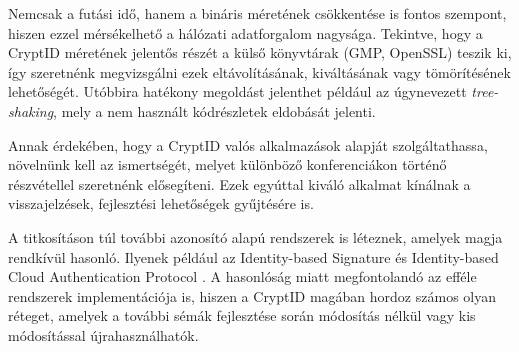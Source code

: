Nemcsak a futási idő, hanem a bináris méretének csökkentése is fontos szempont, hiszen ezzel mérsékelhető a hálózati adatforgalom nagysága. Tekintve, hogy a CryptID méretének jelentős részét a külső könyvtárak (GMP, OpenSSL) teszik ki, így szeretnénk megvizsgálni ezek eltávolításának, kiváltásának vagy tömörítésének lehetőségét. Utóbbira hatékony megoldást jelenthet például az úgynevezett \textit{tree-shaking}, mely a nem használt kódrészletek eldobását jelenti.

Annak érdekében, hogy a CryptID valós alkalmazások alapját szolgáltathassa, növelnünk kell az ismertségét, melyet különböző konferenciákon történő részvétellel szeretnénk elősegíteni. Ezek egyúttal kiváló alkalmat kínálnak a visszajelzések, fejlesztési lehetőségek gyűjtésére is.

A titkosításon túl további azonosító alapú rendszerek is léteznek, amelyek magja rendkívül hasonló. Ilyenek például az Identity-based Signature \cite{Yi::IBS} és Identity-based Cloud Authentication Protocol \cite{Huszti::IdentityBasedCloudAuthentication}. A hasonlóság miatt megfontolandó az efféle rendszerek implementációja is, hiszen a CryptID magában hordoz számos olyan réteget, amelyek a további sémák fejlesztése során módosítás nélkül vagy kis módosítással újrahasználhatók.
